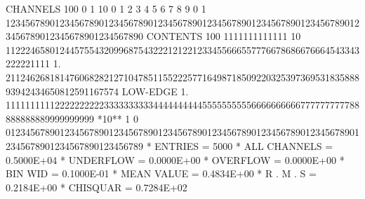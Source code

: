 \begin{Listing}
 CHANNELS 100   0                                                                                                  1   
           10   0        1         2         3         4         5         6         7         8         9         0   
            1   1234567890123456789012345678901234567890123456789012345678901234567890123456789012345678901234567890   
 CONTENTS 100                          1111111111111                                                                
           10                 112224658012445755432099687543222121221233455666557776678686676664543343222221111     
            1.       21124626818147606828212710478511552225771649871850922032539736953183588893942434650812591167574
 LOW-EDGE   1.            111111111122222222223333333333444444444455555555556666666666777777777788888888889999999999
 *10**  1   0   0123456789012345678901234567890123456789012345678901234567890123456789012345678901234567890123456789
 * ENTRIES =       5000      * ALL CHANNELS = 0.5000E+04      * UNDERFLOW = 0.0000E+00      * OVERFLOW = 0.0000E+00
 * BIN WID = 0.1000E-01      * MEAN VALUE   = 0.4834E+00      * R . M . S = 0.2184E+00
 * CHISQUAR  =  0.7284E+02
 

\end{Listing}
